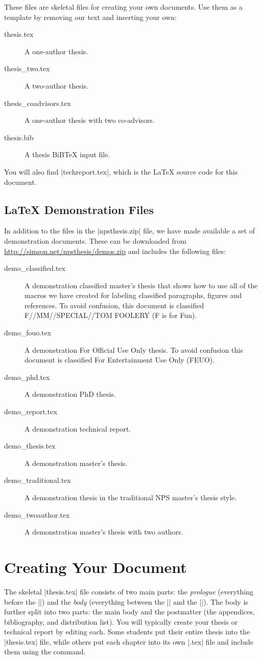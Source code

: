 These files are skeletal files for creating your own documents. Use
them as a template by removing our text and inserting your own:

\begin{description}
\item[thesis.tex] A one-author thesis.
\item[thesis\_two.tex] A two-author thesis.
\item[thesis\_coadvisors.tex] A one-author thesis with two
  co-advisors.
\item[thesis.bib] A thesis BiB\TeX{} input file.
\end{description}

You will also find |techreport.tex|, which is the \LaTeX{} source code for this document.

\subsection{\LaTeX{} Demonstration Files}

In addition to the files in the |npsthesis.zip| file, we have made
available a set of demonstration documents. These can be downloaded
from \url{http://simson.net/npsthesis/demos.zip} and includes the following files:

\begin{description}
\item[demo\_classified.tex] A demonstration classified master's thesis that
  shows how to use all of the macros we have created for labeling
  classified paragraphs, figures and references. To avoid confusion,
  this document is classified F//MM//SPECIAL//TOM FOOLERY (F is for Fun).
\item[demo\_fouo.tex] A demonstration For Official Use Only
  thesis. To avoid confusion this document is classified For
  Entertainment Use Only (FEUO).
\item[demo\_phd.tex] A demonstration PhD thesis.
\item[demo\_report.tex] A demonstration technical report.
\item[demo\_thesis.tex] A demonstration master's thesis.
\item[demo\_traditional.tex] A demonstration thesis in the traditional
  NPS master's thesis style.
\item[demo\_twoauthor.tex] A demonstration master's thesis with two authors.
\end{description}


\section{Creating Your Document}
The skeletal |thesis.tex| file consists of two main parts: the
\emph{prologue} (everything before the ||) and the
\emph{body} (everything between the || and the
||). The body is further split into two parts: the main
body and the postmatter (the appendices, bibliography, and
distribution list). You will typically create your thesis or technical
report by editing
each. Some students put their entire thesis into the |thesis.tex|
file, while others put each chapter into its own |.tex| file and
include them using the \verb|| command.

